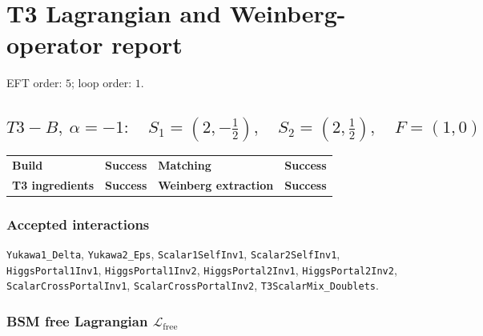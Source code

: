 \documentclass[10pt]{article}
\begin{document}
\section*{T3 Lagrangian and Weinberg-operator report}
EFT order: $5$; loop order: $1$.
\subsection*{$T3-B,\ \alpha=-1:\quad S_1=(2,-\frac{1}{2}),\quad S_2=(2,\frac{1}{2}),\quad F=(1,0)$}
\begin{center}
\begin{tabular}{>{\bfseries}l l >{\bfseries}l l}
\toprule
Build & \textbf{Success} & Matching & \textbf{Success} \\
T3 ingredients & \textbf{Success} & Weinberg extraction & \textbf{Success} \\
\bottomrule
\end{tabular}
\end{center}
\subsubsection*{Accepted interactions}
\texttt{Yukawa1\_Delta}, \texttt{Yukawa2\_Eps}, \texttt{Scalar1SelfInv1}, \texttt{Scalar2SelfInv1}, \texttt{HiggsPortal1Inv1}, \texttt{HiggsPortal1Inv2}, \texttt{HiggsPortal2Inv1}, \texttt{HiggsPortal2Inv2}, \texttt{ScalarCrossPortalInv1}, \texttt{ScalarCrossPortalInv2}, \texttt{T3ScalarMix\_Doublets}.
\subsubsection*{BSM free Lagrangian $\mathcal{L}_{\mathrm{free}}$}
\noindent{}\par
\smallskip
\noindent{}\par
\smallskip
\noindent{}\par
\smallskip
\noindent{}\par
\smallskip
\noindent{}\par
\smallskip
\noindent{}\par
\smallskip
\end{document}
